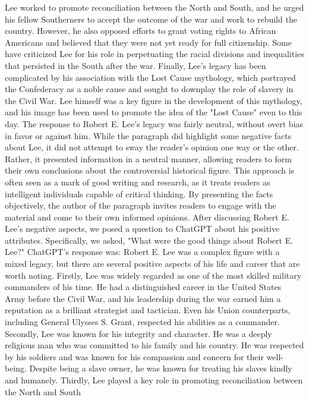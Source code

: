 \documentclass[letterpaper, 10 pt, conference]{ieeeconf}  %
\begin{document}
Lee worked to promote reconciliation between the North and South, and he urged his fellow Southerners to accept the
outcome of the war and work to rebuild the country. However, he also opposed efforts to grant voting rights to African
Americans and believed that they were not yet ready for full citizenship. Some have criticized Lee for his role in
perpetuating the racial divisions and inequalities that persisted in the South after the war. Finally, Lee's legacy has
been complicated by his association with the Lost Cause mythology, which portrayed the Confederacy as a noble cause
and sought to downplay the role of slavery in the Civil War. Lee himself was a key figure in the development of this
mythology, and his image has been used to promote the idea of the "Lost Cause" even to this day.
The response to Robert E. Lee's legacy was fairly neutral, without overt bias in favor or against him. While the paragraph did
highlight some negative facts about Lee, it did not attempt to sway the reader's opinion one way or the other. Rather, it presented
information in a neutral manner, allowing readers to form their own conclusions about the controversial historical figure. This
approach is often seen as a mark of good writing and research, as it treats readers as intelligent individuals capable of critical
thinking. By presenting the facts objectively, the author of the paragraph invites readers to engage with the material and come to
their own informed opinions.
After discussing Robert E. Lee's negative aspects, we posed a question to ChatGPT about his positive attributes. Specifically, we
asked, "What were the good things about Robert E. Lee?" ChatGPT's response was:
Robert E. Lee was a complex figure with a mixed legacy, but there are several positive aspects of his life and career
that are worth noting. Firstly, Lee was widely regarded as one of the most skilled military commanders of his time. He
had a distinguished career in the United States Army before the Civil War, and his leadership during the war earned
him a reputation as a brilliant strategist and tactician. Even his Union counterparts, including General Ulysses S.
Grant, respected his abilities as a commander. Secondly, Lee was known for his integrity and character. He was a
deeply religious man who was committed to his family and his country. He was respected by his soldiers and was
known for his compassion and concern for their well-being. Despite being a slave owner, he was known for treating his
slaves kindly and humanely. Thirdly, Lee played a key role in promoting reconciliation between the North and South
\end{document}
